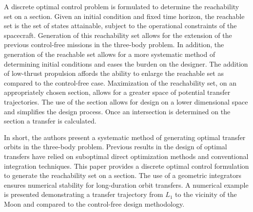 \documentclass[letterpaper, paper,11pt]{AAS}		%
\begin{document}
A discrete optimal control problem is formulated to determine the reachability set on a \Poincare section.
Given an initial condition and fixed time horizon, the reachable set is the set of states attainable, subject to the operational constraints of the spacecraft. 
Generation of this reachability set allows for the extension of the previous control-free missions in the three-body problem.
In addition, the generation of the reachable set allows for a more systematic method of determining initial conditions and eases the burden on the designer. 
The addition of low-thrust propulsion affords the ability to enlarge the reachable set as compared to the control-free case.
Maximization of the reachability set, on an appropriately chosen \Poincare section, allows for a greater space of potential transfer trajectories.
The use of the \Poincare section allows for design on a lower dimensional space and simplifies the design process.
Once an intersection is determined on the \Poincare section a transfer is calculated.

In short, the authors present a systematic method of generating optimal transfer orbits in the three-body problem.
Previous results in the design of optimal transfers have relied on suboptimal direct optimization methods and conventional integration techniques.
This paper provides a discrete optimal control formulation to generate the reachability set on a \Poincare section.
The use of a geometric integrators ensures numerical stability for long-duration orbit transfers.
A numerical example is presented demonstrating a transfer trajectory from \( L_1 \) to the vicinity of the Moon and compared to the control-free design methodology.
\end{document}
